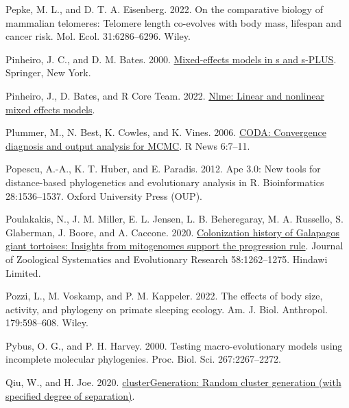 \documentclass[fleqn,10pt,lineno]{wlpeerj} %
\newlength{\cslhangindent}
\newlength{\cslentryspacingunit} %
\newenvironment{CSLReferences}[2] %
 {%
  \setlength{\parindent}{0pt}
  \ifodd #1
  \let\oldpar\par
  \def\par{\hangindent=\cslhangindent\oldpar}
  \fi
  \setlength{\parskip}{#2\cslentryspacingunit}
 }%
 {}
\begin{document}
\begin{CSLReferences}{1}{0}
\leavevmode{}%
Pepke, M. L., and D. T. A. Eisenberg. 2022. On the comparative biology of mammalian telomeres: Telomere length co-evolves with body mass, lifespan and cancer risk. Mol. Ecol. 31:6286--6296. Wiley.

\leavevmode{}%
Pinheiro, J. C., and D. M. Bates. 2000. \href{https://doi.org/10.1007/b98882}{Mixed-effects models in s and s-PLUS}. Springer, New York.

\leavevmode{}%
Pinheiro, J., D. Bates, and R Core Team. 2022. \href{https://CRAN.R-project.org/package=nlme}{Nlme: Linear and nonlinear mixed effects models}.

\leavevmode{}%
Plummer, M., N. Best, K. Cowles, and K. Vines. 2006. \href{https://journal.r-project.org/archive/}{CODA: Convergence diagnosis and output analysis for MCMC}. R News 6:7--11.

\leavevmode{}%
Popescu, A.-A., K. T. Huber, and E. Paradis. 2012. Ape 3.0: New tools for distance-based phylogenetics and evolutionary analysis in {R}. Bioinformatics 28:1536--1537. Oxford University Press (OUP).

\leavevmode{}%
Poulakakis, N., J. M. Miller, E. L. Jensen, L. B. Beheregaray, M. A. Russello, S. Glaberman, J. Boore, and A. Caccone. 2020. \href{https://doi.org/10.1111/jzs.12387}{Colonization history of {G}alapagos giant tortoises: Insights from mitogenomes support the progression rule}. Journal of Zoological Systematics and Evolutionary Research 58:1262--1275. Hindawi Limited.

\leavevmode{}%
Pozzi, L., M. Voskamp, and P. M. Kappeler. 2022. The effects of body size, activity, and phylogeny on primate sleeping ecology. Am. J. Biol. Anthropol. 179:598--608. Wiley.

\leavevmode{}%
Pybus, O. G., and P. H. Harvey. 2000. Testing macro-evolutionary models using incomplete molecular phylogenies. Proc. Biol. Sci. 267:2267--2272.

\leavevmode{}%
Qiu, W., and H. Joe. 2020. \href{https://CRAN.R-project.org/package=clusterGeneration}{clusterGeneration: Random cluster generation (with specified degree of separation)}.


\end{CSLReferences}
\end{document}
